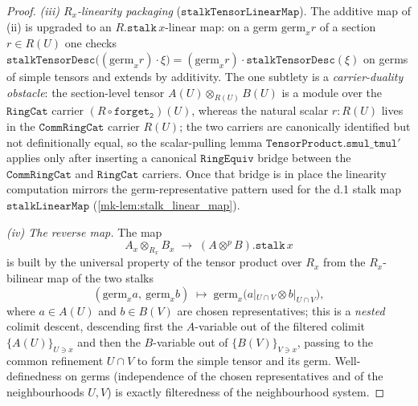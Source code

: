\begin{proof}
  \emph{(iii) \(R_x\)-linearity packaging} (\(\mathtt{stalkTensorLinearMap}\)). The
  additive map of (ii) is upgraded to an \(R.\mathtt{stalk}\,x\)-linear map: on a germ
  \(\mathrm{germ}_x r\) of a section \(r \in R(U)\) one checks
  \(\mathtt{stalkTensorDesc}\bigl((\mathrm{germ}_x r)\cdot \xi\bigr) =
  (\mathrm{germ}_x r)\cdot \mathtt{stalkTensorDesc}(\xi)\) on germs of simple tensors
  and extends by additivity. The one subtlety is a \emph{carrier-duality obstacle}:
  the section-level tensor \(A(U) \otimes_{R(U)} B(U)\) is a module over the
  \(\mathtt{RingCat}\) carrier \((R \circ \mathtt{forget_2})(U)\), whereas the natural
  scalar \(r : R(U)\) lives in the \(\mathtt{CommRingCat}\) carrier \(R(U)\); the two
  carriers are canonically identified but not definitionally equal, so the
  scalar-pulling lemma \(\mathtt{TensorProduct.smul\_tmul'}\) applies only after
  inserting a canonical \(\mathtt{RingEquiv}\) bridge between the
  \(\mathtt{CommRingCat}\) and \(\mathtt{RingCat}\) carriers. Once that bridge is
  in place the linearity computation mirrors the germ-representative pattern used
  for the d.1 stalk map \(\mathtt{stalkLinearMap}\) (\ref{mk-lem:stalk_linear_map}).

  \emph{(iv) The reverse map.} The map
  \[
    A_x \otimes_{R_x} B_x \;\longrightarrow\; (A \otimes^{p} B).\mathtt{stalk}\,x
  \]
  is built by the universal property of the tensor product over \(R_x\) from the
  \(R_x\)-bilinear map of the two stalks
  \[
    (\mathrm{germ}_x a,\ \mathrm{germ}_x b) \;\longmapsto\;
      \mathrm{germ}_x\bigl(a|_{U \cap V} \otimes b|_{U \cap V}\bigr),
  \]
  where \(a \in A(U)\) and \(b \in B(V)\) are chosen representatives; this is a
  \emph{nested} colimit descent, descending first the \(A\)-variable out of the
  filtered colimit \(\{A(U)\}_{U \ni x}\) and then the \(B\)-variable out of
  \(\{B(V)\}_{V \ni x}\), passing to the common refinement \(U \cap V\) to form the
  simple tensor and its germ. Well-definedness on germs (independence of the chosen
  representatives and of the neighbourhoods \(U, V\)) is exactly filteredness of the
  neighbourhood system.


\end{proof}
